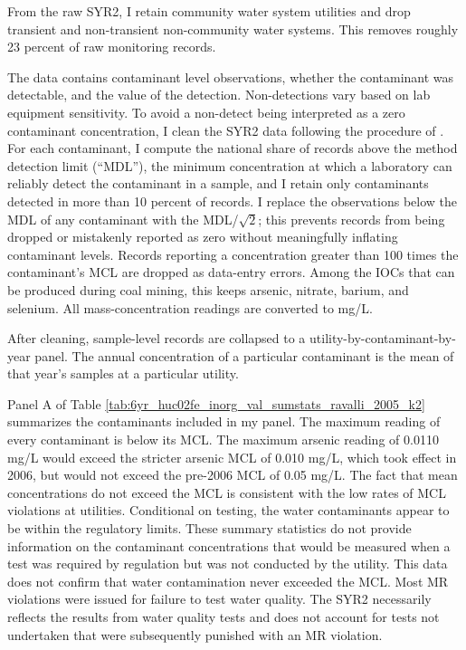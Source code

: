 \documentclass[12pt]{article}
\begin{document}
From the raw SYR2, I retain community water system utilities and drop transient and non-transient non-community water systems. This removes roughly 23 percent of raw monitoring records.

The data contains contaminant level observations, whether the contaminant was detectable, and the value of the detection. Non-detections vary based on lab equipment sensitivity. To avoid a non-detect being interpreted as a zero contaminant concentration, I clean the SYR2 data following the procedure of \textcite{ravalli2022sociodemographic}. For each contaminant, I compute the national share of records above the method detection limit (``MDL''), the minimum concentration at which a laboratory can reliably detect the contaminant in a sample, and I retain only contaminants detected in more than 10 percent of records. I replace the observations below the MDL of any contaminant with the MDL/$\sqrt{2}$; this prevents records from being dropped or mistakenly reported as zero without meaningfully inflating contaminant levels. Records reporting a concentration greater than 100 times the contaminant's MCL are dropped as data-entry errors. Among the IOCs that can be produced during coal mining, this keeps arsenic, nitrate, barium, and selenium. All mass-concentration readings are converted to mg/L. 

After cleaning, sample-level records are collapsed to a utility-by-contaminant-by-year panel. The annual concentration of a particular contaminant is the mean of that year's samples at a particular utility.

Panel A of Table \ref{tab:6yr_huc02fe_inorg_val_sumstats_ravalli_2005_k2} summarizes the contaminants included in my panel. The maximum reading of every contaminant is below its MCL. The maximum arsenic reading of 0.0110 mg/L would exceed the stricter arsenic MCL of 0.010 mg/L, which took effect in 2006, but would not exceed the pre-2006 MCL of 0.05 mg/L. The fact that mean concentrations do not exceed the MCL is consistent with the low rates of MCL violations at utilities. Conditional on testing, the water contaminants appear to be within the regulatory limits. These summary statistics do not provide information on the contaminant concentrations that would be measured when a test was required by regulation but was not conducted by the utility. This data does not confirm that water contamination never exceeded the MCL. Most MR violations were issued for failure to test water quality. The SYR2 necessarily reflects the results from water quality tests and does not account for tests not undertaken that were subsequently punished with an MR violation. 
\end{document}
